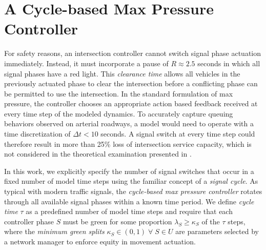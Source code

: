 \section{A Cycle-based Max Pressure Controller} 
For safety reasons, an intersection controller cannot switch signal phase actuation immediately. Instead, it must incorporate a pause of $R\approx2.5$ seconds in which all signal phases have a red light. This \emph{clearance time} allows all vehicles in the previously actuated phase to clear the intersection before a conflicting phase can be permitted to use the intersection. In the standard formulation of max pressure, the controller chooses an appropriate action based feedback received at every time step of the modeled dynamics. To accurately capture queuing behaviors observed on arterial roadways, a model would need to operate with a time discretization of $\Delta t< 10$ seconds. A signal switch at every time step could therefore result in more than 25\% loss of intersection service capacity, which is not considered in the theoretical examination presented in \cite{MaxPressureStochastic}. 

In this work, we explicitly specify the number of signal switches that occur in a fixed number of model time steps using the familiar concept of a \emph{signal cycle}. As typical with modern traffic signals, the \emph{cycle-based max pressure controller} rotates through all available signal phases within a known time period. We define \emph{cycle time} $\tau$ as a predefined number of model time steps and require that each controller phase $S$ must be green for some proportion $\lambda_S \geq \kappa_S$ of the $\tau$ steps, where the \emph{minimum green splits} $\kappa_S \in (0,1) \; \forall \; S \in U $ are parameters selected by a network manager to enforce equity in movement actuation.  

